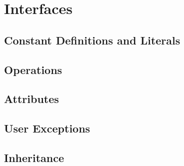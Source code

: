 \section{Interfaces}

\subsection{Constant Definitions and Literals}

\subsection{Operations}

\subsection{Attributes}

\subsection{User Exceptions}

\subsection{Inheritance}


\newpage

